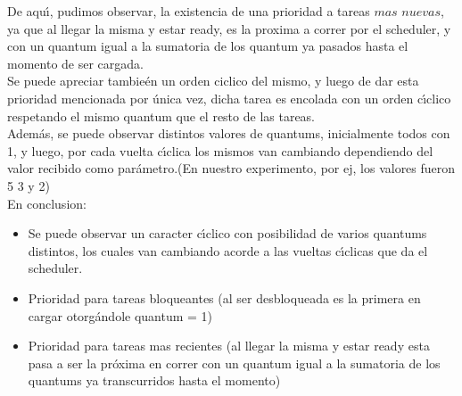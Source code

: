 De aqu\'{\i}, pudimos observar, la existencia de una prioridad a tareas $mas$ $nuevas$, ya que al llegar la misma y estar ready, es
la proxima a correr por el scheduler, y con un quantum igual a la sumatoria de los quantum ya pasados hasta el momento de ser cargada.\\
Se puede apreciar tambie\'{e}n un orden ciclico del mismo, y luego de dar esta prioridad mencionada por \'{u}nica vez, dicha tarea es encolada con un orden c\'{\i}clico
respetando el mismo quantum que el resto de las tareas.\\
Adem\'{a}s, se puede observar distintos valores de quantums, inicialmente todos con 1, y luego, por cada vuelta c\'{\i}clica los mismos van cambiando dependiendo del valor recibido
como par\'{a}metro.(En nuestro experimento, por ej, los valores fueron 5 3 y 2)\\

\indent En conclusion:\\


\begin{itemize}
 \item Se puede observar un caracter c\'{\i}clico con posibilidad de varios quantums distintos, los cuales van cambiando
 acorde a las vueltas c\'{\i}clicas que da el scheduler.
 \item Prioridad para tareas bloqueantes (al ser desbloqueada es la primera en cargar otorg\'{a}ndole quantum = 1)
 \item Prioridad para tareas mas recientes (al llegar la misma y estar ready esta pasa a ser la pr\'{o}xima en correr con un quantum igual
 a la sumatoria de los quantums ya transcurridos hasta el momento)
\end{itemize}



